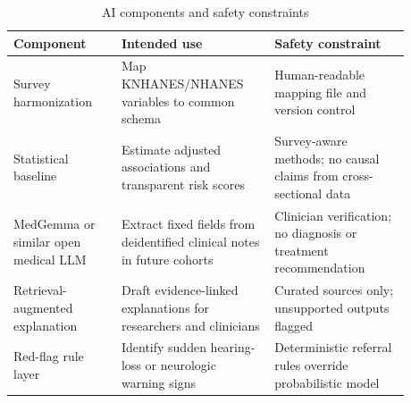 \begin{table}[htbp]
\centering
\caption{AI components and safety constraints}
\label{tab:ai}
\begin{tabular}{p{0.24\linewidth}p{0.34\linewidth}p{0.30\linewidth}}
\toprule
Component & Intended use & Safety constraint \\
\midrule
Survey harmonization & Map KNHANES/NHANES variables to common schema & Human-readable mapping file and version control \\
Statistical baseline & Estimate adjusted associations and transparent risk scores & Survey-aware methods; no causal claims from cross-sectional data \\
MedGemma or similar open medical LLM & Extract fixed fields from deidentified clinical notes in future cohorts & Clinician verification; no diagnosis or treatment recommendation \\
Retrieval-augmented explanation & Draft evidence-linked explanations for researchers and clinicians & Curated sources only; unsupported outputs flagged \\
Red-flag rule layer & Identify sudden hearing-loss or neurologic warning signs & Deterministic referral rules override probabilistic model \\
\bottomrule
\end{tabular}
\end{table}

